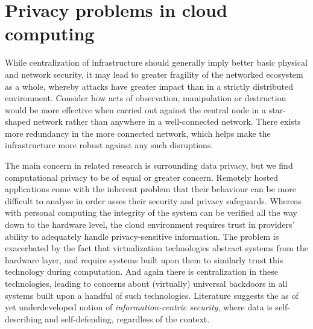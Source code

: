 \documentclass[12pt]{article}
\begin{document}
\section{Privacy problems in cloud computing}
\label{sec:problems_in_cloud_computing}

While centralization of infrastructure should generally imply better basic physical and network security, it may lead to greater fragility of the networked ecosystem as a whole, whereby attacks have greater impact than in a strictly distributed environment.
Consider how acts of observation, manipulation or destruction would be more effective when carried out against the central node in a star-shaped network rather than anywhere in a well-connected network.
There exists more redundancy in the more connected network, which helps make the infrastructure more robust against any such disruptions.

The main concern in related research is surrounding data privacy, but we find computational privacy to be of equal or greater concern.
Remotely hosted applications come with the inherent problem that their behaviour can be more difficult to analyse in order asses their security and privacy safeguards.
Whereas with personal computing the integrity of the system can be verified all the way down to the hardware level, the cloud environment requires trust in providers' ability to adequately handle privacy-sensitive information.
The problem is exacerbated by the fact that virtualization technologies abstract systems from the hardware layer, and require systems built upon them to similarly trust this technology during computation.
And again there is centralization in these technologies, leading to concerns about (virtually) universal backdoors in all systems built upon a handful of such technologies.
Literature suggests the as of yet underdeveloped notion of \textit{information-centric security}, where data is self-describing and self-defending, regardless of the context. \cite{chow2009controlling}

\end{document}
